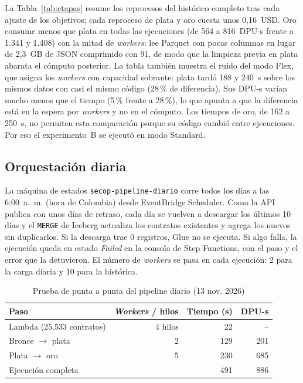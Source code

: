 \documentclass[conference]{IEEEtran}
\begin{document}
La Tabla~\ref{tab:etapas} resume los reprocesos del histórico completo tras cada ajuste de los objetivos; cada reproceso de plata y oro cuesta unos 0,16~USD. Oro consume menos que plata en todas las ejecuciones (de 564 a 816~DPU-s frente a 1.341 y 1.408) con la mitad de \textit{workers}: lee Parquet con pocas columnas en lugar de 2,3~GB de JSON comprimido con 91, de modo que la limpieza previa en plata abarata el cómputo posterior. La tabla también muestra el ruido del modo Flex, que asigna los \textit{workers} con capacidad sobrante: plata tardó 188 y 240~s sobre los mismos datos con casi el mismo código (28\,\% de diferencia). Sus DPU-s varían mucho menos que el tiempo (5\,\% frente a 28\,\%), lo que apunta a que la diferencia está en la espera por \textit{workers} y no en el cómputo. Los tiempos de oro, de 162 a 250~s, no permiten esta comparación porque su código cambió entre ejecuciones. Por eso el experimento~B se ejecutó en modo Standard.

\subsection{Orquestación diaria}
La máquina de estados \texttt{secop-pipeline-diario} corre todos los días a las 6:00~a.~m. (hora de Colombia) desde EventBridge Scheduler. Como la API publica con unos días de retraso, cada día se vuelven a descargar los últimos 10 días y el \texttt{MERGE} de Iceberg actualiza los contratos existentes y agrega los nuevos sin duplicarlos. Si la descarga trae 0 registros, Glue no se ejecuta. Si algo falla, la ejecución queda en estado \textit{Failed} en la consola de Step Functions, con el paso y el error que la detuvieron. El número de \textit{workers} se pasa en cada ejecución: 2 para la carga diaria y 10 para la histórica.

\begin{table}[htbp]
\caption{Prueba de punta a punta del pipeline diario (13 nov. 2026)}
\label{tab:diario}
\centering
\begin{tabular}{@{}lrrr@{}}
\toprule
Paso & \textit{Workers} / hilos & Tiempo (s) & DPU-s \\
\midrule
Lambda (25.533 contratos) & 4 hilos & 22 & -- \\
Bronce $\rightarrow$ plata & 2 & 129 & 201 \\
Plata $\rightarrow$ oro & 5 & 230 & 685 \\
\midrule
Ejecución completa & & 491 & 886 \\
\bottomrule
\end{tabular}
\end{table}
\end{document}
